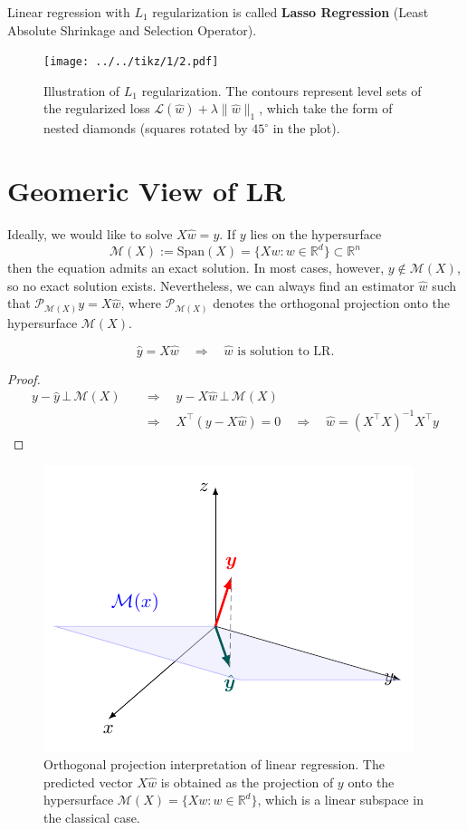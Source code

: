 \documentclass[../main]{subfiles}
\begin{document}
Linear regression with $L_1$ regularization is called \textbf{Lasso Regression} (Least Absolute Shrinkage and Selection Operator).
\begin{figure}[H]
  \centering
  \texttt{[image: ../../tikz/1/2.pdf]}
  \caption{Illustration of $L_1$ regularization. 
  The contours represent level sets of the regularized loss $\mathcal{L}(\hat w) + \lambda \|\hat w\|_1$, 
  which take the form of nested diamonds (squares rotated by $45^\circ$ in the plot). }
\end{figure}
\section{Geomeric View of LR}

Ideally, we would like to solve $X \hat w = y.$ If $y$ lies on the hypersurface 
\begin{equation}
  \mathcal{M}(X) :=\mathrm{Span}(X)= \{ X w : w \in \mathbb{R}^d \} \subset \mathbb{R}^n
\end{equation}
then the equation admits an exact solution. In most cases, however, $y \notin \mathcal{M}(X)$, so no exact solution exists. Nevertheless, we can always find an estimator $\hat w$ such that $\mathcal P_{\mathcal{M}(X)} y = X \hat w$, where $\mathcal P_{\mathcal{M}(X)}$ denotes the orthogonal projection onto the hypersurface $\mathcal{M}(X)$.
\begin{proposition}
  \begin{equation}
      \hat y=X\hat w\quad\Rightarrow\quad\hat w \text{ is solution to LR.}
  \end{equation}
\end{proposition}
\begin{proof}
  \begin{align*}
    y-\hat y\,\bot\, \mathcal{M}(X)\quad&\Rightarrow\quad y-X\hat w\,\bot\, \mathcal{M}(X)\\
    &\Rightarrow\quad X^\top(y-X\hat w)=0\quad\Rightarrow\quad \hat w=(X^\top X)^{-1}X^{\top}y
  \end{align*}
\end{proof}
\begin{figure}[H]
  \centering
  \includegraphics{../../tikz/1/3.pdf}
  \caption{Orthogonal projection interpretation of linear regression. 
The predicted vector $X\hat w$ is obtained as the projection of $y$ onto the hypersurface 
$\mathcal M(X)=\{Xw : w\in\mathbb{R}^d\}$, which is a linear subspace in the classical case.}
\end{figure}
\end{document}
